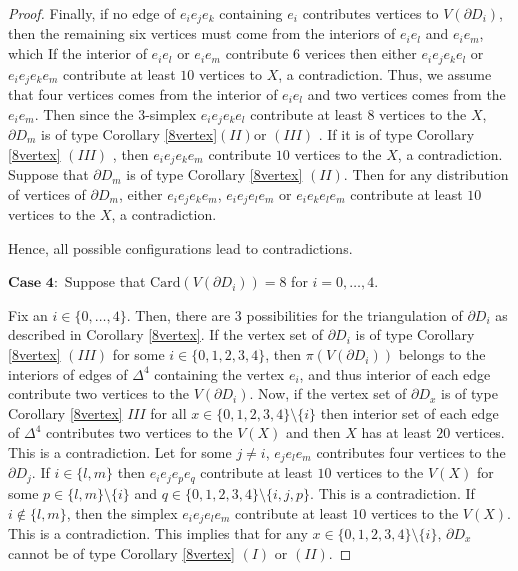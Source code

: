 \documentclass[11pt]{amsart}
\numberwithin{equation}{section}
\theoremstyle{definition}
\newcommand{\D}{\Delta}
\begin{document}
\begin{proof}
Finally, if no edge of $e_i e_j e_k$ containing $e_i$ contributes vertices to $V(\partial D_i)$, then the remaining six vertices must come from the interiors of $e_i e_l$ and $e_i e_m$, which 
If the interior of $e_ie_l$ or $e_ie_m$ contribute $6$ verices then either $e_ie_je_ke_l$ or $e_ie_je_ke_m$ contribute at least $10$ vertices to $X$, a contradiction. Thus, we assume that four vertices comes from the interior of $e_ie_l$ and two vertices comes from the $e_ie_m$. Then since the $3$-simplex $e_ie_je_ke_l$ contribute at least  $8$ vertices to the $X$, $\partial D_m$ is of type Corollary \ref{8vertex}$(II)$or $(III)$ . If it is of type Corollary \ref{8vertex} $(III)$ , then $e_ie_je_ke_m$ contribute $10$ vertices to the $X$, a contradiction. Suppose that $\partial D_m$ is of type Corollary \ref{8vertex} $(II)$. Then for any distribution of vertices of $\partial D_m$, either $e_i{e_j}e_{k}e_{m}$, $e_{i}e_{j}e_{l}e_{m}$ or $e_{i}e_{k}e_{l}e_{m}$ contribute at least $10$ vertices to the $X$, a contradiction.

Hence, all possible configurations lead to contradictions.





$\textbf{Case 4}:$ Suppose that $\mathrm{Card}( V(\partial D_i)) = 8$  for $i=0, \ldots, 4$. 

Fix an $i \in \{0, \ldots, 4\}$. Then, there are $3$ possibilities for the triangulation of $\partial D_i$ as described in Corollary \ref{8vertex}. 
If the vertex set of $\partial D_i$ is of type Corollary \ref{8vertex} $(III)$ for some $i\in \{0,1,2,3,4\}$, then $\pi(V(\partial D_i))$ belongs to the interiors of edges of $\Delta^4$ containing the vertex $e_i$, and thus interior of each edge contribute two vertices to the $V(\partial D_i)$. Now, if the vertex set of $\partial D_x$ is of type Corollary \ref{8vertex} $III$ for all $x\in \{0,1,2,3,4\}\setminus \{i\}$
 then interior set  of each edge of $\D^4$ contributes two vertices to the $V(X)$ and then $X$ has at least $20$ vertices. This is a contradiction.
Let for some $j\neq i$, $e_je_le_m$  contributes four vertices to the $\partial D_j$. If $i\in \{l,m\}$ then $e_ie_je_pe_q$ contribute at least $10$ vertices to the $V(X)$ for some $p\in \{l,m\}\setminus \{i\}$ and $q\in \{0,1,2,3,4\}\setminus \{i,j,p\}$. This is a contradiction. If $i\notin\{l,m\}$, then the simplex $e_ie_je_le_m$ contribute at least $10$ vertices to the $V(X)$. This is a contradiction. This implies that for any $x\in \{0,1,2,3,4\}\setminus \{i\}$, $\partial D_x$ cannot be of type Corollary \ref{8vertex} $(I)$ or $(II)$.


\end{proof}
\end{document}

